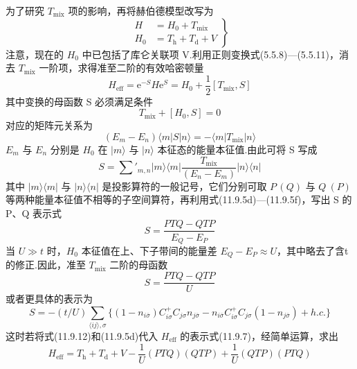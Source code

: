 为了研究 $T_{\mathrm{mix}}$ 项的影响，再将赫伯德模型改写为
\begin{equation}
\left.\begin{aligned}
  H&=H_{0}+T_{\mathrm{mix}}\\
  H_{0}&=T_{\mathrm{h}}+T_{\mathrm{d}}+V
\end{aligned}\right\}
\end{equation}
注意，现在的 $H_{0}$ 中已包括了库仑关联项 V.利用正则变换式(5.5.8)—(5.5.11)，消去 $T_{\mathrm{mix}}$ 一阶项，求得准至二阶的有效哈密顿量
\begin{equation}
  H_{\mathrm{eff}}=\mathrm{e}^{-S}H\mathrm{e}^{S}=H_{0}+\frac{1}{2}[T_{\mathrm{mix}},S]
\end{equation}
其中变换的母函数 S 必须满足条件
\begin{equation}
  T_{\mathrm{mix}}+[H_{0},S]=0
\end{equation}
对应的矩阵元关系为
\begin{equation}
  (E_{m}-E_{n})\langle m|S|n\rangle=-\langle m|T_{\mathrm{mix}}|n\rangle
\end{equation}
$E_{m}$ 与 $E_{n}$ 分别是 $H_{0}$ 在 $|m\rangle$ 与 $|n\rangle$ 本征态的能量本征值.由此可将 S 写成
\begin{equation}
  S=\sum'_{m,n}|m\rangle\langle m|\frac{T_{\mathrm{mix}}}{(E_{n}-E_{m})}|n\rangle\langle n|
\end{equation}
其中 $|m\rangle\langle m|$ 与 $|n\rangle\langle n|$ 是投影算符的一般记号，它们分别可取 $P\,(Q)$ 与 $Q\ (P)$ 等两种能量本征值不相等的子空间算符，再利用式(11.9.5d)—(11.9.5f)，写出 S 的 P、Q 表示式
\begin{equation}
  S=\frac{PTQ-QTP}{E_{Q}-E_{P}}
\end{equation}
当 $U\gg t$ 时，$H_{0}$ 本征值在上、下子带间的能量差 $E_{Q}-E_{P}\approx U$，其中略去了含t的修正.因此，准至 $T_{\mathrm{mix}}$ 二阶的母函数
\begin{equation}
  S=\frac{PTQ-QTP}{U}
\end{equation}
或者更具体的表示为
\begin{equation}
  S=-(t/U)\sum_{\langle ij\rangle,\sigma}\bigl\{(1-n_{i\overline{\sigma}})C_{i\sigma}^{+}C_{j\sigma}n_{j\overline{\sigma}}
  -n_{i\overline{\sigma}}C_{i\sigma}^{+}C_{j\sigma}(1-n_{j\overline{\sigma}})+h.c.\bigr\}
\end{equation}
这时若将式(11.9.12)和(11.9.5d)代入 $H_{\mathrm{eff}}$ 的表示式(11.9.7)，经简单运算，求出
\begin{equation}
  H_{\mathrm{eff}}=T_{\mathrm{h}}+T_{\mathrm{d}}+V-\frac{1}{U}(PTQ)(QTP)+\frac{1}{U}(QTP)(PTQ)
\end{equation}
